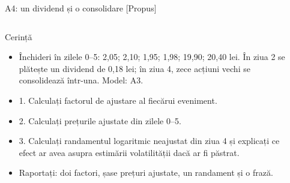 \begin{frame}{A4: un dividend și o consolidare [Propus]}
\propsub
\itemsize{\footnotesize}
\begin{columns}[T]
\begin{column}{\taskw}
\begin{block}{Cerință}
\begin{itemize}
    \item Închideri în zilele 0--5: 2,05; 2,10; 1,95; 1,98; 19,90; 20,40 lei. În ziua 2 se plătește un dividend de 0,18 lei; în ziua 4, zece acțiuni vechi se consolidează într-una. Model: A3.
    \item 1. Calculați factorul de ajustare al fiecărui eveniment.
    \item 2. Calculați prețurile ajustate din zilele 0--5.
    \item 3. Calculați randamentul logaritmic neajustat din ziua 4 și explicați ce efect ar avea asupra estimării volatilității dacă ar fi păstrat.
    \item Raportați: doi factori, șase prețuri ajustate, un randament și o frază.
\end{itemize}
\end{block}
\end{column}
\begin{column}{\solw}
\end{column}
\end{columns}
\end{frame}

